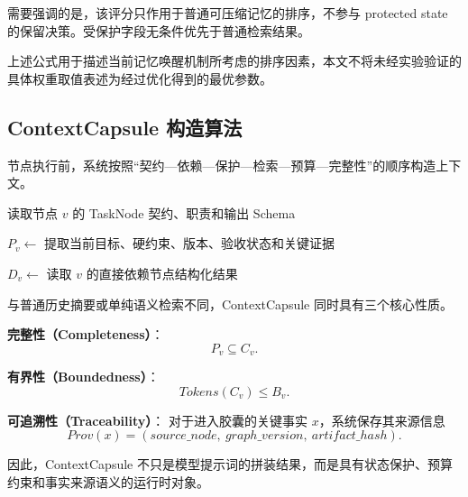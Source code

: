 \documentclass[UTF8,a4paper,12pt,oneside]{ctexbook}
\begin{document}
需要强调的是，该评分只作用于普通可压缩记忆的排序，不参与 protected state 的保留决策。受保护字段无条件优先于普通检索结果。

上述公式用于描述当前记忆唤醒机制所考虑的排序因素，本文不将未经实验验证的具体权重取值表述为经过优化得到的最优参数。


\subsection{ContextCapsule 构造算法}

节点执行前，系统按照“契约—依赖—保护—检索—预算—完整性”的顺序构造上下文。

\begin{algorithm}[H]
\caption{受保护约束下的 ContextCapsule 构造}
\label{alg:context-capsule}

读取节点 $v$ 的 TaskNode 契约、职责和输出 Schema\;

$P_v \leftarrow$ 提取当前目标、硬约束、版本、验收状态和关键证据\;

$D_v \leftarrow$ 读取 $v$ 的直接依赖节点结构化结果\;

\end{algorithm}

与普通历史摘要或单纯语义检索不同，ContextCapsule 同时具有三个核心性质。

\textbf{完整性（Completeness）}：
\[
P_v\subseteq C_v.
\]

\textbf{有界性（Boundedness）}：
\[
Tokens(C_v)\le B_v.
\]

\textbf{可追溯性（Traceability）}：
对于进入胶囊的关键事实 $x$，系统保存其来源信息
\[
Prov(x)
=
(source\_node,\ graph\_version,\ artifact\_hash).
\]

因此，ContextCapsule 不只是模型提示词的拼装结果，而是具有状态保护、预算约束和事实来源语义的运行时对象。
\end{document}
